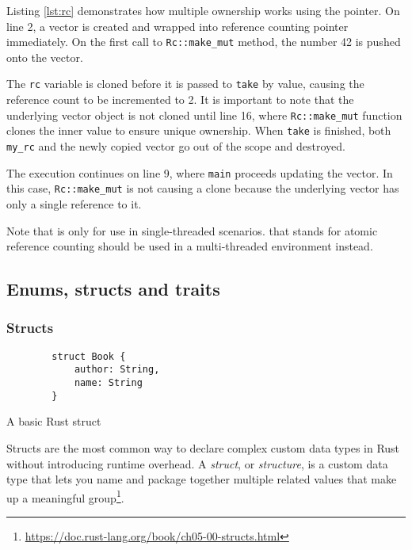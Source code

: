 Listing \ref{lst:rc} demonstrates how multiple ownership works using the  pointer. On line 2, a vector is created and wrapped into reference counting pointer immediately. On the first call to \texttt{Rc::make_mut} method, the number 42 is pushed onto the vector.

The \texttt{rc} variable is cloned before it is passed to \texttt{take} by value, causing the reference count to be incremented to 2. It is important to note that the underlying vector object is not cloned until line 16, where \texttt{Rc::make_mut} function clones the inner value to ensure unique ownership. When \texttt{take} is finished, both \texttt{my_rc} and the newly copied vector go out of the scope and destroyed.

The execution continues on line 9, where \texttt{main} proceeds updating the vector. In this case, \texttt{Rc::make_mut} is not causing a clone because the underlying vector has only a single reference to it.

Note that  is only for use in single-threaded scenarios.  that stands for atomic reference counting should be used in a multi-threaded environment instead.

\subsection{Enums, structs and traits}

\subsubsection*{Structs}

\begin{listing}[!htbp]

    \centering
    \begin{verbatim}
        struct Book {
            author: String,
            name: String
        }
    \end{verbatim}

    \caption{A basic Rust struct}
    \label{lst:struct}
\end{listing}

Structs are the most common way to declare complex custom data types in Rust without introducing runtime overhead. A \emph{struct}, or \emph{structure}, is a custom data type that lets you name and package together multiple related values that make up a meaningful group\footnote{\url{https://doc.rust-lang.org/book/ch05-00-structs.html}}.

